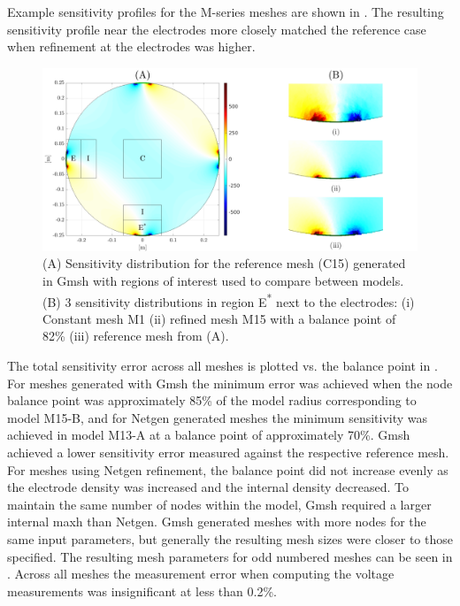 Example sensitivity profiles for the M-series meshes are shown in .
The resulting sensitivity profile near the electrodes more closely matched the reference case 
when refinement at the electrodes was higher. 

\begin{figure}
  \includegraphics[width=\columnwidth]{chapter4-mesh_refinement/imgs/roi_methods_figure.pdf}
  \caption[Sensitivity distribution and regions of interest]{\label{fig:roiMethods} (A) Sensitivity distribution for the reference mesh
  (C15) generated in Gmsh with regions of interest used to compare between models. 
  (B) 3 sensitivity distributions in region E\textsuperscript{*} next to the electrodes: (i) Constant mesh M1
  (ii) refined mesh M15 with a balance point of 82\% (iii) reference mesh from (A).
  }
\end{figure}

The total sensitivity error across all meshes is plotted vs. the balance point in
. For meshes generated with Gmsh the minimum error was 
achieved when the node balance point was approximately 85\% of the model radius corresponding
to model M15-B, 
and for Netgen generated meshes the minimum sensitivity was achieved in model M13-A at a balance point
of approximately 70\%. Gmsh achieved a lower sensitivity error measured against
the respective reference mesh. For meshes using Netgen refinement, the balance point did not
increase evenly as the electrode density was increased and the internal density decreased. 
To maintain the same number of nodes within the model, Gmsh required a larger internal maxh
than Netgen. Gmsh generated meshes with more nodes for the same input
parameters, but  generally the resulting mesh sizes were closer to those specified. The
resulting mesh parameters for odd numbered meshes can be seen in .
Across all meshes the measurement error when computing the voltage measurements was insignificant
at less than 0.2\%.

